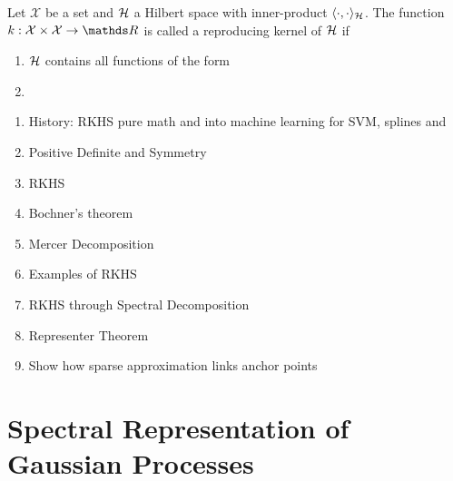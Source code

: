 \begin{definition}
  Let $\mathcal{X}$ be a set and ${\mathcal{H}}$ a Hilbert space with inner-product $\langle \cdot, \cdot \rangle_{{\mathcal{H}}}$. The function $k: \mathcal{X} \times \mathcal{X} \rightarrow \Reals$ is called a reproducing kernel of ${\mathcal{H}}$ if
  \begin{enumerate}
    \item ${\mathcal{H}}$ contains all functions of the form 
    \item 
  \end{enumerate}
\end{definition}

\begin{enumerate}
  \item History: RKHS pure math and into machine learning for SVM, splines and 
  \item Positive Definite and Symmetry
  \item RKHS
  \item Bochner's theorem
  \item Mercer Decomposition
  \item Examples of RKHS
  \item RKHS through Spectral Decomposition
  \item Representer Theorem
  \item Show how sparse approximation links anchor points
\end{enumerate}

\section{Spectral Representation of Gaussian Processes}
